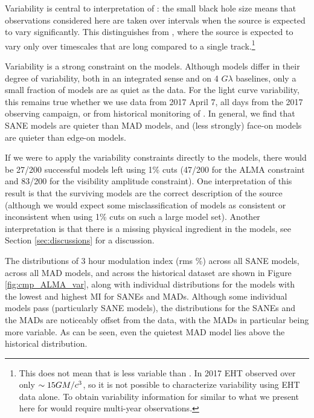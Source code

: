 Variability is central to interpretation of \sgra: the small black hole size means that observations considered here are taken over intervals when the source is expected to vary significantly.  This distinguishes \sgra from , where the source is expected to vary only over timescales that are long compared to a single track.\footnote{This does not mean that  is less variable than \sgra.  In 2017 EHT observed  over only $\sim 15GM/c^3$, so it is not possible to characterize  variability using EHT data alone.  To obtain variability information for  similar to what we present here for \sgra would require multi-year observations.}

Variability is a strong constraint on the models.  Although models differ in their degree of variability, both in an integrated sense and on 4 $G\lambda$ baselines, only a small fraction of models are as quiet as the data.  For the light curve variability, this remains true whether we use data from 2017 April 7, all days from the 2017 observing campaign, or from historical monitoring of \sgra.   In general, we find that SANE models are quieter than MAD models, and (less strongly) face-on models are quieter than edge-on models.

If we were to apply the variability constraints directly to the models, there would be 27/200 successful models left using 1\% cuts (47/200 for the ALMA constraint and 83/200 for the visibility amplitude constraint).  One interpretation of this result is that the surviving models are the correct description of the source (although we would expect some misclassification of models as consistent or inconsistent when using 1\% cuts on such a large model set).  Another interpretation is that there is a missing physical ingredient in the models, see Section \ref{sec:discussions} for a discussion.


The distributions of 3 hour modulation index (rms \%) across all SANE models, across all MAD models, and across the historical dataset are shown in Figure \ref{fig:cmp_ALMA_var}, along with individual distributions for the models with the lowest and highest MI for SANEs and MADs. Although some individual models  pass (particularly SANE models), the distributions for the SANEs and the MADs are noticeably offset from the data, with the MADs in particular being more variable. As can be seen, even the quietest MAD model lies above the historical distribution.


